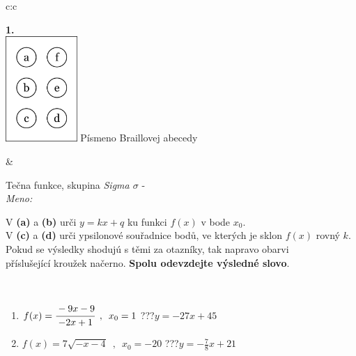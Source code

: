 \documentclass[10pt]{report}
\begin{document}
\begin{tabular}{c:c}
\begin{minipage}[c][104.5mm][t]{0.5\linewidth}
\begin{center}
\begin{minipage}{0.20\linewidth}
\begin{center}
{\Huge\bfseries 1.} \\[2mm]
\includegraphics[height=40mm]{../images/braille.png}
{\small Písmeno Braillovej abecedy}
\end{center}
\end{minipage}
\end{center}
\end{minipage}
&
\begin{minipage}[c][104.5mm][t]{0.5\linewidth}
\begin{center}
\vspace{7mm}
{\huge Tečna funkce, skupina \textit{Sigma $\sigma$} -}\\[5mm]
\textit{Meno:}\phantom{xxxxxxxxxxxxxxxxxxxxxxxxxxxxxxxxxxxxxxxxxxxxxxxxxxxxxxxxxxxxxxxxx}\\[5mm]
\begin{minipage}{0.95\linewidth}
\begin{center}
V \textbf{(a)} a \textbf{(b)} urči  $y = kx + q$ ku funkci $f(x)$ v bode $x_0$.\\V \textbf{(c)} a \textbf{(d)} urči ypsilonové souřadnice bodů, ve kterých je sklon $f(x)$ rovný $k$.\\Pokud se výsledky shodujú s těmi za otazníky, tak napravo obarvi\\příslušející kroužek načerno. \textbf{Spolu odevzdejte výsledné slovo}.
\end{center}
\end{minipage}
\\[1mm]
\begin{minipage}{0.79\linewidth}
\begin{center}
\begin{varwidth}{\linewidth}
\begin{enumerate}
\small
\item $f(x)=\cfrac{-9x-9}{-2x+1}\enspace , \enspace x_0=1$\quad \dotfill\; ???\;\dotfill \quad $y = -27x+45$
\item $f(x)=7\sqrt{-x-4}\enspace , \enspace x_0=-20$\quad \dotfill\; ???\;\dotfill \quad $y = -\frac{7}{8}x+21$

\end{enumerate}
\end{varwidth}
\end{center}
\end{minipage}
\end{center}
\end{minipage}
\end{tabular}
\end{document}
